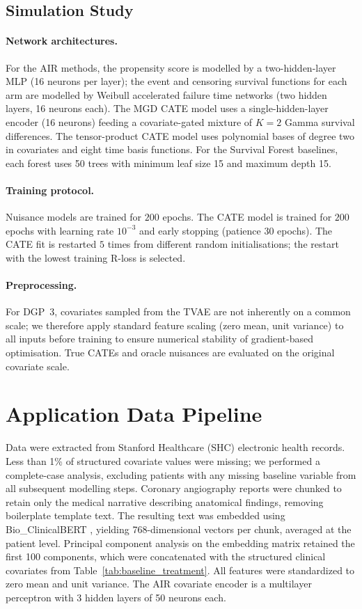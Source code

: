 \documentclass{article}
\begin{document}
\subsection*{Simulation Study}

\paragraph{Network architectures.}
For the AIR methods, the propensity score is modelled by a two-hidden-layer MLP (16 neurons per layer); the event and censoring survival functions for each arm are modelled by Weibull accelerated failure time networks (two hidden layers, 16 neurons each).  The MGD CATE model uses a single-hidden-layer encoder (16 neurons) feeding a covariate-gated mixture of $K=2$ Gamma survival differences.  The tensor-product CATE model uses polynomial bases of degree two in covariates and eight time basis functions.
For the Survival Forest baselines, each forest uses 50 trees with minimum leaf size 15 and maximum depth 15.

\paragraph{Training protocol.}
Nuisance models are trained for $200$ epochs.  The CATE model is trained for $200$ epochs with learning rate $10^{-3}$ and early stopping (patience $30$ epochs).  The CATE fit is restarted $5$ times from different random initialisations; the restart with the lowest training R-loss is selected.

\paragraph{Preprocessing.}
For DGP~3, covariates sampled from the TVAE are not inherently on a common scale; we therefore apply standard feature scaling (zero mean, unit variance) to all inputs before training to ensure numerical stability of gradient-based optimisation.  True CATEs and oracle nuisances are evaluated on the original covariate scale.

\section{Application Data Pipeline}\label{appendix:pipeline}

Data were extracted from Stanford Healthcare (SHC) electronic health records.
Less than 1\% of structured covariate values were missing; we performed a complete-case analysis, excluding patients with any missing baseline variable from all subsequent modelling steps.
Coronary angiography reports were chunked to retain only the medical narrative describing anatomical findings, removing boilerplate template text.
The resulting text was embedded using Bio\_ClinicalBERT \citep{alsentzer2019clinicalbert}, yielding 768-dimensional vectors per chunk, averaged at the patient level.
Principal component analysis on the embedding matrix retained the first 100 components, which were concatenated with the structured clinical covariates from Table~\ref{tab:baseline_treatment}.
All features were standardized to zero mean and unit variance.
The AIR covariate encoder is a multilayer perceptron with 3 hidden layers of 50 neurons each.
\end{document}
